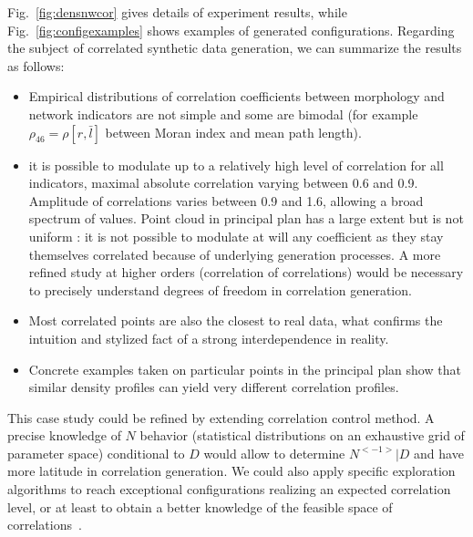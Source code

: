 \documentclass{bmcart}
\begin{document}
Fig.~\ref{fig:densnwcor} gives details of experiment results, while Fig.~\ref{fig:configexamples} shows examples of generated configurations. Regarding the subject of correlated synthetic data generation, we can summarize the results as follows:
\begin{itemize}
\item Empirical distributions of correlation coefficients between morphology and network indicators are not simple and some are bimodal (for example $\rho_{46}=\rho[r,\bar{l}]$  between Moran index and mean path length).
\item it is possible to modulate up to a relatively high level of correlation for all indicators, maximal absolute correlation varying between 0.6 and 0.9. Amplitude of correlations varies between 0.9 and 1.6, allowing a broad spectrum of values. Point cloud in principal plan has a large extent but is not uniform : it is not possible to modulate at will any coefficient as they stay themselves correlated because of underlying generation processes. A more refined study at higher orders (correlation of correlations) would be necessary to precisely understand degrees of freedom in correlation generation.
\item Most correlated points are also the closest to real data, what confirms the intuition and stylized fact of a strong interdependence in reality.
\item Concrete examples taken on particular points in the principal plan show that similar density profiles can yield very different correlation profiles.
\end{itemize}





This case study could be refined by extending correlation control method. A precise knowledge of $N$ behavior (statistical distributions on an exhaustive grid of parameter space) conditional to $D$ would allow to determine $N^{<-1>} | D$ and have more latitude in correlation generation. We could also apply specific exploration algorithms to reach exceptional configurations realizing an expected correlation level, or at least to obtain a better knowledge of the feasible space of correlations~\cite{10.1371/journal.pone.0138212}.
\end{document}

